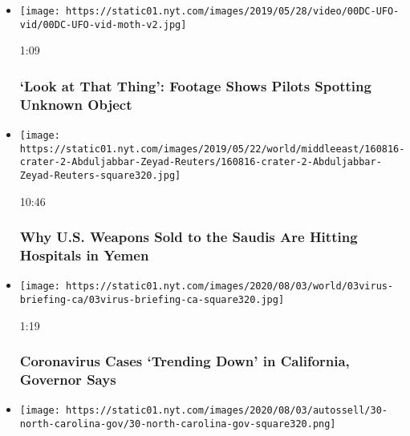 \begin{itemize}
\item
  \href{https://www.nytimes.com/video/us/100000006525294/ufo-video-navy.html?action=click\&module=video-series-bar\&region=header\&pgtype=Article\&playlistId=video/u-s}{}

  \texttt{[image: https://static01.nyt.com/images/2019/05/28/video/00DC-UFO-vid/00DC-UFO-vid-moth-v2.jpg]}

  1:09

  \hypertarget{look-at-that-thing-footage-shows-pilots-spotting-unknown-object}{%
  \subsubsection{`Look at That Thing': Footage Shows Pilots Spotting
  Unknown
  Object}\label{look-at-that-thing-footage-shows-pilots-spotting-unknown-object}}
\item
  \href{https://www.nytimes.com/video/world/middleeast/100000006466384/yemen-war-saudi-arabia-usa.html?action=click\&module=video-series-bar\&region=header\&pgtype=Article\&playlistId=video/u-s}{}

  \texttt{[image: https://static01.nyt.com/images/2019/05/22/world/middleeast/160816-crater-2-Abduljabbar-Zeyad-Reuters/160816-crater-2-Abduljabbar-Zeyad-Reuters-square320.jpg]}

  10:46

  \hypertarget{why-us-weapons-sold-to-the-saudis-are-hitting-hospitals-in-yemen}{%
  \subsubsection{Why U.S. Weapons Sold to the Saudis Are Hitting
  Hospitals in
  Yemen}\label{why-us-weapons-sold-to-the-saudis-are-hitting-hospitals-in-yemen}}
\item
  \href{https://www.nytimes.com/video/us/100000007271181/california-virus-cases-trend-down.html?action=click\&module=video-series-bar\&region=header\&pgtype=Article\&playlistId=video/u-s}{}

  \texttt{[image: https://static01.nyt.com/images/2020/08/03/world/03virus-briefing-ca/03virus-briefing-ca-square320.jpg]}

  1:19

  \hypertarget{coronavirus-cases-trending-down-in-california-governor-says}{%
  \subsubsection{Coronavirus Cases `Trending Down' in California,
  Governor
  Says}\label{coronavirus-cases-trending-down-in-california-governor-says}}
\item
  \texttt{[image: https://static01.nyt.com/images/2020/08/03/autossell/30-north-carolina-gov/30-north-carolina-gov-square320.png]}


\end{itemize}
